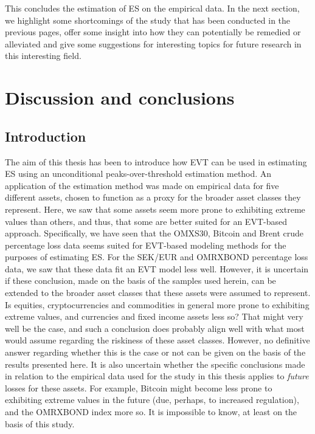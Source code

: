 \documentclass[a4paper,11pt]{article}
\theoremstyle{definition}
\theoremstyle{definition}
\theoremstyle{definition}
\theoremstyle{definition}
\theoremstyle{remark}
\begin{document}
This concludes the estimation of ES on the empirical data. In the next section, we highlight some shortcomings of the study that has been conducted in the previous pages, offer some insight into how they can potentially be remedied or alleviated and give some suggestions for interesting topics for future research in this interesting field.

\newpage

\hypertarget{sec:slutsats}{%
\section{Discussion and conclusions}\label{sec:slutsats}}

\hypertarget{introduction-3}{%
\subsection{Introduction}\label{introduction-3}}

The aim of this thesis has been to introduce how EVT can be used in estimating ES using an unconditional peaks-over-threshold estimation method. An application of the estimation method was made on empirical data for five different assets, chosen to function as a proxy for the broader asset classes they represent. Here, we saw that some assets seem more prone to exhibiting extreme values than others, and thus, that some are better suited for an EVT-based approach. Specifically, we have seen that the OMXS30, Bitcoin and Brent crude percentage loss data seems suited for EVT-based modeling methods for the purposes of estimating ES. For the SEK/EUR and OMRXBOND percentage loss data, we saw that these data fit an EVT model less well. However, it is uncertain if these conclusion, made on the basis of the samples used herein, can be extended to the broader asset classes that these assets were assumed to represent. Is equities, cryptocurrencies and commodities in general more prone to exhibiting extreme values, and currencies and fixed income assets less so? That might very well be the case, and such a conclusion does probably align well with what most would assume regarding the riskiness of these asset classes. However, no definitive answer regarding whether this is the case or not can be given on the basis of the results presented here. It is also uncertain whether the specific conclusions made in relation to the empirical data used for the study in this thesis applies to \emph{future} losses for these assets. For example, Bitcoin might become less prone to exhibiting extreme values in the future (due, perhaps, to increased regulation), and the OMRXBOND index more so. It is impossible to know, at least on the basis of this study.
\end{document}
